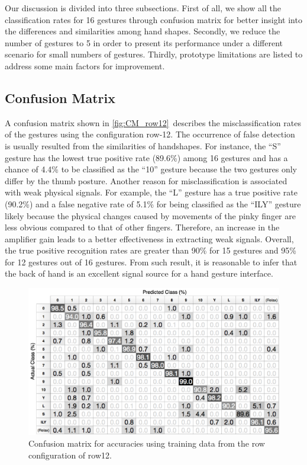 \documentclass{sigchi}
\begin{document}
Our discussion is divided into three subsections. 
First of all, we show all the classification rates for 16 gestures through confusion matrix for better insight into the differences and similarities among hand shapes.
Secondly, we reduce the number of gestures to 5 in order to present its performance under a different scenario for small numbers of gestures.
Thirdly, prototype limitations are listed to address some main factors for improvement.

\subsection{Confusion Matrix}

A confusion matrix shown in \autoref{fig:CM_row12}\ describes the misclassification rates of the gestures using the configuration row-12.
The occurrence of false detection is usually resulted from the similarities of handshapes.
For instance, the ``S'' gesture has the lowest true positive rate (89.6\%) among 16 gestures and has a chance of 4.4\% to be classified as the ``10'' gesture because the two gestures only differ by the thumb posture.
Another reason for misclassification is associated with weak physical signals.
For example, the ``L'' gesture has a true positive rate (90.2\%) and a false negative rate of 5.1\% for being classified as the ``ILY'' gesture likely because the  physical changes caused by movements of the pinky finger are less obvious compared to that of other fingers. Therefore, an increase in the amplifier gain leads to a better effectiveness in extracting weak signals.
Overall, the true positive recognition rates are greater than 90\% for 15 gestures and 95\% for 12 gestures out of 16 gestures. From such result, it is reasonable to infer that the back of hand is an excellent signal source for a hand gesture interface.
\begin{figure}[hb]
  \begin{center}
  \includegraphics[width=1\columnwidth]{figures/CM_row12_v2.pdf}
  \caption{Confusion matrix for accuracies using training data from the row configuration of row12.}
  \label{fig:CM_row12}
  \end{center}
\end{figure}
\end{document}
